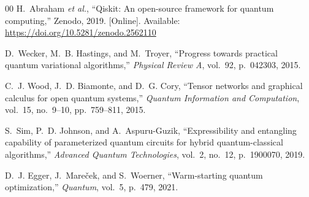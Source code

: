 \documentclass[conference]{IEEEtran}
\begin{document}
\begin{thebibliography}{00}
H.~Abraham \textit{et al.},
``Qiskit: An open-source framework for quantum computing,'' 
Zenodo, 2019. 
[Online]. Available: \url{https://doi.org/10.5281/zenodo.2562110}

D.~Wecker, M.~B. Hastings, and M.~Troyer,
``Progress towards practical quantum variational algorithms,'' 
\textit{Physical Review A}, vol.~92, p.~042303, 2015.

C.~J. Wood, J.~D. Biamonte, and D.~G. Cory,
``Tensor networks and graphical calculus for open quantum systems,'' 
\textit{Quantum Information and Computation}, vol.~15, no.~9--10, pp.~759--811, 2015.

S.~Sim, P.~D. Johnson, and A.~Aspuru-Guzik,
``Expressibility and entangling capability of parameterized quantum circuits for hybrid quantum-classical algorithms,'' 
\textit{Advanced Quantum Technologies}, vol.~2, no.~12, p.~1900070, 2019.

D.~J. Egger, J.~Mareček, and S.~Woerner, 
``Warm-starting quantum optimization,'' 
\textit{Quantum}, vol.~5, p.~479, 2021.

\end{thebibliography}
\end{document}
